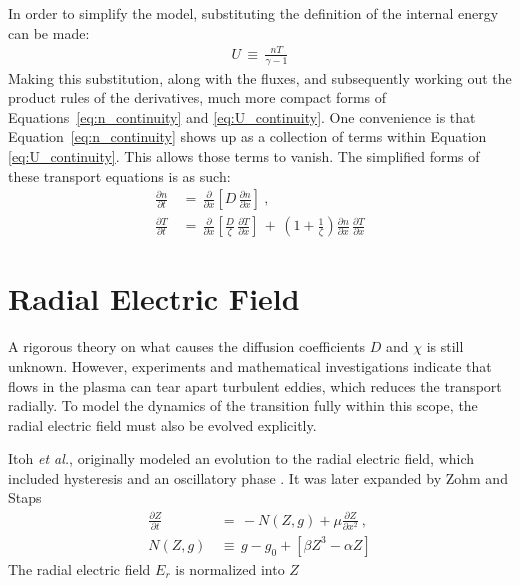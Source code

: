 In order to simplify the model, substituting the definition of the internal energy can be made:
\begin{align} %
	U \,\equiv\, \frac{n T}{\gamma - 1} \label{eq:U_definition}
\end{align}
Making this substitution, along with the fluxes, and subsequently working out the product rules of the derivatives, much more compact forms of Equations~\ref{eq:n_continuity} and \ref{eq:U_continuity}.
One convenience is that Equation~\ref{eq:n_continuity} shows up as a collection of terms within Equation \ref{eq:U_continuity}.
This allows those terms to vanish.
The simplified forms of these transport equations is as such:
\begin{align} %
	\frac{\partial n}{\partial t} \,&=\, \frac{\partial}{\partial x} \left[D \, \frac{\partial n}{\partial x}\right]~,\label{eq:n_compact} \\
	\frac{\partial T}{\partial t} \,&=\, \frac{\partial}{\partial x} \left[\frac{D}{\zeta} \, \frac{\partial T}{\partial x}\right] \,+\, \left(1 + \frac{1}{\zeta}\right) \frac{\partial n}{\partial x} \, \frac{\partial T}{\partial x} \label{eq:T_compact}
\end{align}

\section{Radial Electric Field}\label{sec:Z_equation}
A rigorous theory on what causes the diffusion coefficients $D$ and $\chi$ is still unknown.
However, experiments and mathematical investigations indicate that flows in the plasma can tear apart turbulent eddies, which reduces the transport radially.\todo{\color{red}{Reword?}}
To model the dynamics of the transition fully within this scope, the radial electric field must also be evolved explicitly.

Itoh \emph{et al.}, originally modeled an evolution to the radial electric field, which included hysteresis and an oscillatory phase \cite{itoh_edge_1991}.
It was later expanded by Zohm \cite{zohm_dynamic_1994} and Staps \cite{staps_backstepping_2017}
\begin{align} %
	\frac{\partial Z}{\partial t} \,&=\, -N(Z,g) + \mu \frac{\partial Z}{\partial x^2}~,\label{eq:original_z} \\
	N(Z,g) \,&\equiv\, g - g_0 + \left[\beta Z^3 - \alpha Z\right]
\end{align}
The radial electric field $E_r$ is normalized into $Z$

